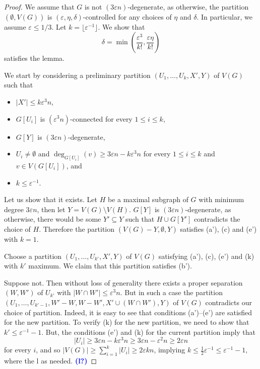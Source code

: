 \documentclass{article}
\newtheorem{lem}[thm]{Lemma}
\newcommand{\eps}{\varepsilon}
\newcommand{\s}[1]{\left(#1\right)}
\begin{document}

\begin{proof}  We assume that $G$ is not $(3\eps n)$-degenerate, as otherwise, the partition $(\emptyset, V(G))$ is $(\eps,\eta,\delta)$-controlled for any choices of $\eta$ and $\delta$. In particular, we assume  $\eps \leq 1/3$.  Let $k  =\lfloor \eps^{-1} \rfloor$. We show that $$\delta = \min\s{\frac{\eps^3}{k!},\frac{\eps\eta}{k!}}$$ satisfies the lemma. 
	
We start by  considering a preliminary partition $(U_1,\ldots, U_{k}, X', Y)$ of $V(G)$ such that \begin{itemize}
	\item [(a')] $|X'| \leq k\eps^{3}n$,
	\item [(b')] $G[U_i]$ is $(\eps^3 n)$-connected for every $1 \leq i \leq k$,
	\item [(c)] $G[Y]$ is $(3\eps n)$-degenerate,
	\item [(e')] $U_i \neq \emptyset$ and $\deg_{G[U_i]}(v) \geq 3\eps n - k\eps^3 n$ for every $1 \leq i \leq k$ and $v \in V(G[U_i])$, and 
	\item[(k)] $k\leq \eps^{-1}$.
 \end{itemize}		
Let us show that it exists. Let $H$ be a maximal subgraph of $G$ with minimum degree $3 \eps n$, then let $Y = V(G) \setminus V(H)$. $G[Y]$ is $(3 \eps n)$-degenerate, as otherwise, there would be some $Y' \subseteq Y$ such that $H \cup G[Y']$ contradicts the choice of $H$.  Therefore the partition $(V(G)-Y, \emptyset, Y)$ satisfies (a'), (c) and (e') with $k=1$.

Choose a partition    $(U_1,\ldots, U_{k'}, X', Y)$ of $V(G)$ satisfying (a'), (c), (e') and (k) with $k'$ maximum. 
We claim that this partition satisfies (b'). 

Suppose not. Then without loss of generality there exists a proper separation $(W,W')$ of $U_{k'}$ with $|W \cap W'| \leq \eps^3 n$. But in such a case the partition  $(U_1,\ldots, U_{k'-1}, W' -W, W-W',  X' \cup (W \cap W'), Y)$ of $V(G)$ contradicts our choice of partition. Indeed, it is easy to see that conditions (a')--(e') are satisfied for the new partition. To verify (k) for the new partition, we need to show that $k' \leq \eps^{-1}-1$. But, the conditions (e') and (k) for the current partition imply that $$|U_i| \geq  3\eps n - k \eps^3 n \geq 3\eps n - \eps^2 n  \geq 2 \eps n$$ for every $i$, and so $|V(G)| \geq \sum_{i=1}^k|U_i| \geq 2\eps k n$, implying $k \leq \frac{1}{2}\eps^{-1} \leq \eps^{-1}-1,$ where the l as needed. \textbf{\textcolor{blue}{(l?)}}


\end{proof}
\end{document}
